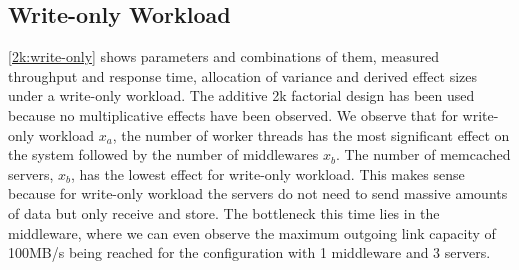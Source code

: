 \documentclass[11pt,a4paper]{article}
\begin{document}
\subsection{Write-only Workload}
\autoref{2k:write-only} shows parameters and combinations of them, measured throughput and response time, allocation of variance and derived effect sizes under a write-only workload. The additive 2k factorial design has been used because no multiplicative effects have been observed. We observe that for write-only workload $x_a$, the number of worker threads has the most significant effect on the system followed by the number of middlewares $x_b$. The number of memcached servers, $x_b$, has the lowest effect for write-only workload. This makes sense because for write-only workload the servers do not need to send massive amounts of data but only receive and store. The bottleneck this time lies in the middleware, where we can even observe the maximum outgoing link capacity of 100MB/s being reached for the configuration with 1 middleware and 3 servers.
\end{document}
